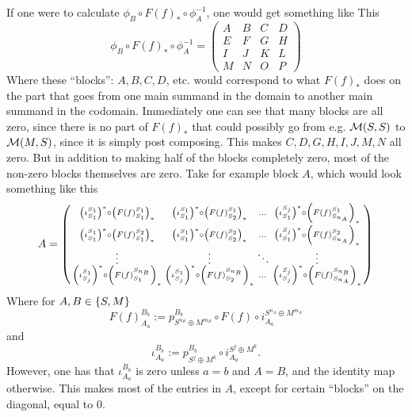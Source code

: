 \begin{remark}
    If one were to calculate \( \phi_B \circ F(f)_* \circ \phi_A^{-1} \), one would get something like This
    \[
        \phi_B \circ F(f)_* \circ \phi_A^{-1} =
        \begin{pmatrix}
            A & B & C & D \\
            E & F & G & H \\
            I & J & K & L \\
            M & N & O & P
        \end{pmatrix}
    \]
    Where these ``blocks'': \( A, B, C, D \), etc. would correspond to what \( F(f)_* \) does on the part that goes from one main summand in the domain to another main summand in the codomain. Immediately one can see that many blocks are all zero, since there is no part of \( F(f)_* \) that could possibly go from e.g. \( {\mathcal{M}}(S, S) \) to \( {\mathcal{M}}(M, S) \), since it is simply post composing. This makes \( C, D, G, H, I, J, M, N \) all zero. But in addition to making half of the blocks completely zero, most of the non-zero blocks themselves are zero. Take for example block \( A \), which would look something like this
    \[
        A =
        \begin{psmallmatrix}
            \left(  \iota_{S_1}^{S_1}  \right)^* \circ \left(  F(f)_{S_1}^{S_1}  \right)_* &
            \left(  \iota_{S_1}^{S_1}  \right)^* \circ \left(  F(f)_{S_2}^{S_1}  \right)_* &
            \dots &
            \left(  \iota_{S_1}^{S_j}  \right)^* \circ \left(  F(f)_{S_{n_A}}^{S_1}  \right)_* \\
            \left(  \iota_{S_1}^{S_1}  \right)^* \circ \left(  F(f)_{S_1}^{S_2}  \right)_* &
            \left(  \iota_{S_1}^{S_1}  \right)^* \circ \left(  F(f)_{S_2}^{S_2}  \right)_* &
            \dots &
            \left(  \iota_{S_1}^{S_j}  \right)^* \circ \left(  F(f)_{S_{n_A}}^{S_2}  \right)_* \\
            \vdots &
            \vdots &
            \ddots &
            \vdots \\
            \left(  \iota_{S_j}^{S_1}  \right)^* \circ \left(  F(f)_{S_1}^{S_{n_B}}  \right)_* &
            \left(  \iota_{S_j}^{S_1}  \right)^* \circ \left(  F(f)_{S_2}^{S_{n_B}}  \right)_* &
            \dots &
            \left(  \iota_{S_j}^{S_j}  \right)^* \circ \left(  F(f)_{S_{n_A}}^{S_{n_B}}  \right)_*
        \end{psmallmatrix}
    \]
    Where for \( A, B \in \left\{  S, M  \right\} \)
    \[
        F(f)_{A_a}^{B_b} := p_{S^{n_B} \oplus M^{m_B}}^{B_b} \circ F(f) \circ i_{A_a}^{S^{n_A} \oplus M^{m_A}}
    \]
    and
    \[
        \iota_{A_a}^{B_b} := p_{S^j \oplus M^k}^{B_b} \circ i_{A_a}^{S^j \oplus M^k}.
    \]
    However, one has that \( \iota_{A_a}^{B_b} \) is zero unless \( a = b \) and \( A = B \), and the identity map otherwise. This makes most of the entries in \( A \), except for certain ``blocks'' on the diagonal, equal to \( 0 \).


\end{remark}
